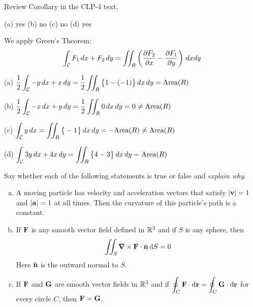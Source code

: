 \begin{hint} 
Review Corollary  in the CLP-4 text.
\end{hint}

\begin{answer} 
(a) yes\qquad
(b) no\qquad
(c) no\qquad
(d) yes
\end{answer}


\begin{solution}
We apply Green's Theorem:
\begin{equation*}
\int_{\mathcal{C}} F_1 \,d x + F_2 \,d y 
 =\iint_R \left(
     \frac{\partial F_2}{\partial x} - \frac{\partial F_1}{\partial y}\right)
    \,d x d y
\end{equation*}

(a)
$\displaystyle\frac{1}{2} \int_{\mathcal{C}} -y \,d x +x \,d y
   =\frac{1}{2}\iint_R \big\{1 -(-1)\big\} \,d x \,d y = \text{Area}(R) $

(b)
$\displaystyle\frac{1}{2} \int_{\mathcal{C}} -x \,d x + y \,d y 
       = \frac{1}{2}\iint_R  0 \,d x \,d y 
       =0 \neq \text{Area}(R)$

(c)
$\displaystyle\int_{\mathcal{C}} y \,d x =\iint_R \big\{-1\big\}  \,d x \,d y 
         = -\text{Area}(R)\neq \text{Area}(R)$

(d)
$\displaystyle\int_{\mathcal{C}} 3y\,d x + 4x \,d y 
           = \iint_R \big\{4-3\big\} \,d x \,d y = \text{Area}(R)$
\end{solution}


\begin{question}[M317 2018A] %
Say whether each of the following statements is true or false
and \emph{explain why}. 
\begin{enumerate}[(a)]
\item
A moving particle has velocity and acceleration
vectors that satisfy $|\mathbf{v}| = 1$ and $|\mathbf{a}|=1$
at all times.  Then the curvature of this particle's
path is a constant. 

\item
If $\mathbf{F}$ is any smooth vector field defined in 
$\mathbb{R}^3$ and if $S$ is any sphere, then
$$
\dblInt_{S}\vnabla\times\vF\cdot\hn\,\dee{S}=0
$$
Here  $\hat{\mathbf{n}}$ is the outward normal to $S$.

\item
If $\mathbf{F}$ and $\mathbf{G}$ are smooth vector fields in $\mathbb{R}^3$
and if $\displaystyle\oint_C \mathbf{F}\cdot \mathrm{d}\mathbf{r}=\oint_C \mathbf{G}\cdot \mathrm{d}\mathbf{r}$
for every circle $C$, then $\mathbf{F}=\mathbf{G}$.


\end{enumerate}
\end{question}

